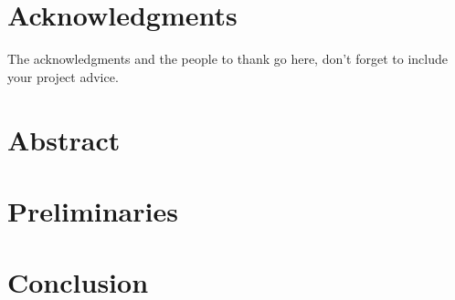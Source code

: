 \documentclass[a4paper,11pt,twoside,openright]{WCarticle}
\begin{document}

\tpage
\pagestyle{plain}

\chapter*{Acknowledgments}
The acknowledgments and the people to thank go here, don't forget to include your project advice. 


\chapter*{Abstract} 


\iffalse
\tableofcontents
\listoffigures
\listoftables
\fi
\cleardoublepage
\pagestyle{fancy}


\iffalse
\chapter{Introduction} \label{chap:intro}\pagenumbering{arabic}



\chapter{Related Work} \label{chap:backgrd}


\fi

\chapter{Preliminaries} \label{chap:prelim}


\iffalse
\chapter{Algorithm} \label{chap:alg}



\chapter{Implementation} \label{chap:impl}



\chapter{Evaluation} \label{chap:eval}


\fi
\chapter{Conclusion} \label{chap:conclusion}



\end{document}
